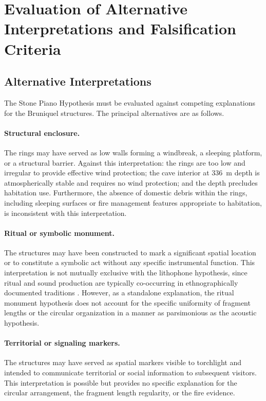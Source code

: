 \documentclass[12pt]{article}
\begin{document}
\section{Evaluation of Alternative Interpretations and Falsification Criteria}

\subsection{Alternative Interpretations}

The Stone Piano Hypothesis must be evaluated against competing explanations for the Bruniquel structures. The principal alternatives are as follows.

\paragraph{Structural enclosure.} The rings may have served as low walls forming a windbreak, a sleeping platform, or a structural barrier. Against this interpretation: the rings are too low and irregular to provide effective wind protection; the cave interior at 336~m depth is atmospherically stable and requires no wind protection; and the depth precludes habitation use. Furthermore, the absence of domestic debris within the rings, including sleeping surfaces or fire management features appropriate to habitation, is inconsistent with this interpretation.

\paragraph{Ritual or symbolic monument.} The structures may have been constructed to mark a significant spatial location or to constitute a symbolic act without any specific instrumental function. This interpretation is not mutually exclusive with the lithophone hypothesis, since ritual and sound production are typically co-occurring in ethnographically documented traditions \citep{Needham1967}. However, as a standalone explanation, the ritual monument hypothesis does not account for the specific uniformity of fragment lengths or the circular organization in a manner as parsimonious as the acoustic hypothesis.

\paragraph{Territorial or signaling markers.} The structures may have served as spatial markers visible to torchlight and intended to communicate territorial or social information to subsequent visitors. This interpretation is possible but provides no specific explanation for the circular arrangement, the fragment length regularity, or the fire evidence.
\end{document}
